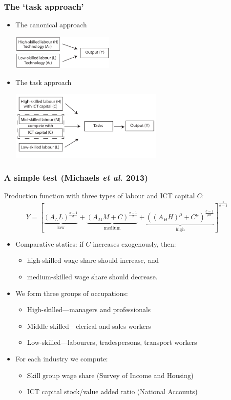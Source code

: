 \documentclass[red]{beamer}
\newcommand{\vitem}{\vfill\item}
\begin{document}
\begin{frame}[c]
\frametitle{The `task approach'}
\begin{itemize}
\item The canonical approach\\
\begin{center}
\includegraphics[width=2in]{slides_fig/CES.pdf}
\end{center}
\item The task approach\\
\begin{center}
\includegraphics[width=3in]{slides_fig/CES_tasks.pdf}
\end{center}
\end{itemize}
\end{frame}

\begin{frame}[c]
  \frametitle{A simple test (Michaels {\em et al.} 2013)}
Production function with three types of labour and ICT capital $C$:
$$
Y = \left[
  \underbrace{(A_LL)^\frac{\sigma-1}{\sigma}}_{\text{low}}
  +
  \underbrace{(A_MM + C)^\frac{\sigma-1}{\sigma}}_{\text{medium}}
  +
  \underbrace{((A_HH)^\mu + C^\mu)^\frac{\sigma-1}{\mu\sigma}}_{\text{high}}
  \right]^\frac{1}{\sigma-1}
$$
  \begin{itemize}
  \item Comparative statics: if $C$ increases exogenously, then: 
  \begin{itemize}
  \item high-skilled wage share should increase, and 
  \item medium-skilled wage share should decrease.
  \end{itemize}
  \vitem We form three groups of occupations:
  \begin{itemize}
  \item High-skilled---managers and professionals
  \item Middle-skilled---clerical and sales workers
  \item Low-skilled---labourers, tradespersons, transport workers
  \end{itemize}
  \vitem For each industry we compute:
  \begin{itemize}
  \item Skill group wage share (Survey of Income and Housing)
  \item ICT capital stock/value added ratio (National Accounts)
  \end{itemize}
\end{itemize}
\end{frame}
\end{document}
